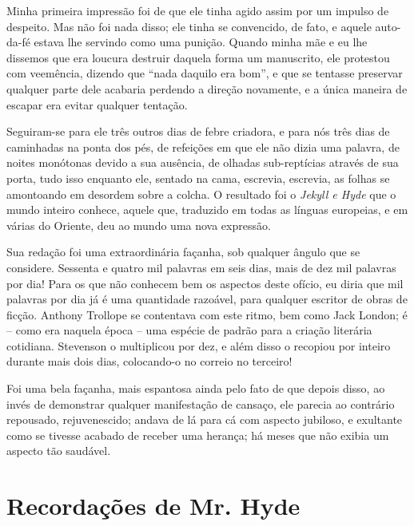 Minha primeira impressão foi de que ele tinha agido assim por um impulso
de despeito.  Mas não foi nada disso; ele tinha se convencido, de
fato, e aquele auto-da-fé estava lhe servindo como uma punição.  Quando
minha mãe e eu lhe dissemos que era loucura destruir daquela forma um
manuscrito, ele protestou com veemência, dizendo que “nada daquilo era
bom”, e que se tentasse preservar qualquer parte dele acabaria perdendo
a direção novamente, e a única maneira de escapar era evitar qualquer
tentação.

Seguiram-se para ele três outros dias de febre criadora, e para nós três
dias de caminhadas na ponta dos pés, de refeições em que ele não dizia
uma palavra, de noites monótonas devido a sua ausência, de olhadas
sub-reptícias através de sua porta, tudo isso enquanto ele, sentado na
cama, escrevia, escrevia, as folhas se amontoando em desordem sobre a
colcha. O resultado foi o \textit{Jekyll e Hyde} que o mundo
inteiro conhece, aquele que, traduzido em todas as línguas europeias, e
em várias do Oriente, deu ao mundo uma nova expressão.

Sua redação foi uma extraordinária façanha, sob qualquer ângulo que se
considere.  Sessenta e quatro mil palavras em seis dias, mais de dez
mil palavras por dia!  Para os que não conhecem bem os aspectos deste
ofício, eu diria que mil palavras por dia já é uma quantidade razoável,
para qualquer escritor de obras de ficção.  Anthony Trollope se
contentava com este ritmo, bem como Jack London; é -- como era naquela
época -- uma espécie de padrão para a criação literária cotidiana. 
Stevenson o multiplicou por dez, e além disso o recopiou por inteiro
durante mais dois dias, colocando-o no correio no terceiro!

Foi uma bela façanha, mais espantosa ainda pelo fato de que depois
disso, ao invés de demonstrar qualquer manifestação de cansaço, ele
parecia ao contrário repousado, rejuvenescido; andava de lá para cá com
aspecto jubiloso, e exultante como se tivesse acabado de receber uma
herança; há meses que não exibia um aspecto tão saudável. 


\chapter[Recordações de Mr. Hyde\\ --- Fanny Van de Grift-Stevenson]{Recordações de Mr. Hyde}

